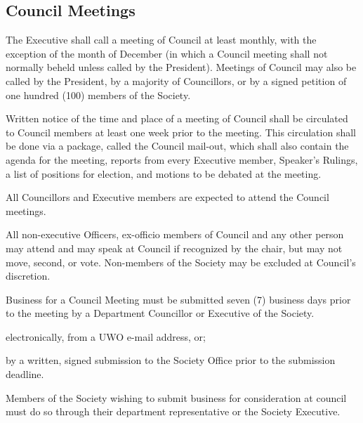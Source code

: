 \subsection{Council Meetings}
\begin{longenum}[ label*=\thesubsection.\arabic*., align=left]
	\item The Executive shall call a meeting of Council at least monthly, with the exception of the month of December (in which a Council meeting shall not normally beheld unless called by the President).  Meetings of Council may also be called by the President, by a majority of Councillors, or by a signed petition of one hundred (100) members of the Society.
    \item Written notice of the time and place of a meeting of Council shall be circulated to Council members at least one week prior to the meeting. This circulation shall be done via a package, called the Council mail-out, which shall also contain the agenda for the meeting, reports from every Executive member, Speaker's Rulings, a list of positions for election, and motions to be debated at the meeting.
    \item All Councillors and Executive members are expected to attend the Council meetings. 
    \item All non-executive Officers, ex-officio members of Council and any other person may attend and may speak at Council if recognized by the chair, but may not move, second, or vote. Non-members of the Society may be excluded at Council's discretion. 
    \item Business for a Council Meeting must be submitted seven (7) business days prior to the meeting by a Department Councillor or Executive of the Society.
	\begin{longenum}[ label*=\arabic*., align=left]
		\item electronically, from a UWO e-mail address, or;
        \item by a written, signed submission to the Society Office prior to the submission deadline.
     \end{longenum}
    \item Members of the Society wishing to submit business for consideration at council must do so through their department representative or the Society Executive.
    

\end{longenum}

